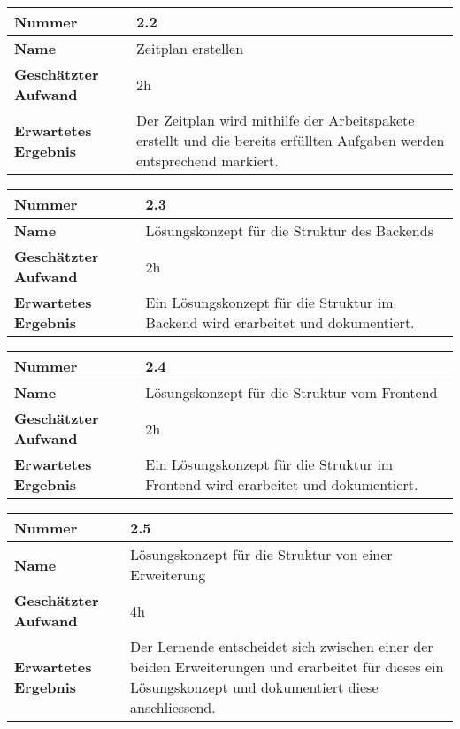 \begin{longtable}{p{}|p{}}
	\hline
	\textbf{Nummer}                 & \textbf{2.2}            \\
	\hline
	\textbf{Name}   				& Zeitplan erstellen                  \\
	\hline
	\textbf{Geschätzter Aufwand}    & 2h                                    \\
	\hline
	\textbf{Erwartetes Ergebnis}    & Der Zeitplan wird mithilfe der Arbeitspakete erstellt und die bereits erfüllten Aufgaben werden entsprechend markiert.                                    \\
	\hline
\end{longtable}\label{tab:planen-2.2}

\begin{longtable}{p{}|p{}}
	\hline
	\textbf{Nummer}                 & \textbf{2.3}            \\
	\hline
	\textbf{Name}   				& Lösungskonzept für die Struktur des Backends                  \\
	\hline
	\textbf{Geschätzter Aufwand}    & 2h                                    \\
	\hline
	\textbf{Erwartetes Ergebnis}    & Ein Lösungskonzept für die Struktur im Backend wird erarbeitet und dokumentiert.                                    \\
	\hline
\end{longtable}\label{tab:planen-2.3}

\begin{longtable}{p{}|p{}}
	\hline
	\textbf{Nummer}                 & \textbf{2.4}            \\
	\hline
	\textbf{Name}   				& Lösungskonzept für die Struktur vom Frontend                  \\
	\hline
	\textbf{Geschätzter Aufwand}    & 2h                                    \\
	\hline
	\textbf{Erwartetes Ergebnis}    & Ein Lösungskonzept für die Struktur im Frontend wird erarbeitet und dokumentiert.                                    \\
	\hline
\end{longtable}\label{tab:planen-2.4}

\begin{longtable}{p{}|p{}}
	\hline
	\textbf{Nummer}                 & \textbf{2.5}            \\
	\hline
	\textbf{Name}   				& Lösungskonzept für die Struktur von einer Erweiterung                  \\
	\hline
	\textbf{Geschätzter Aufwand}    & 4h                                    \\
	\hline
	\textbf{Erwartetes Ergebnis}    & Der Lernende entscheidet sich zwischen einer der beiden Erweiterungen und erarbeitet für dieses ein Lösungskonzept und dokumentiert diese anschliessend.                                    \\
	\hline
\end{longtable}\label{tab:planen-2.5}

